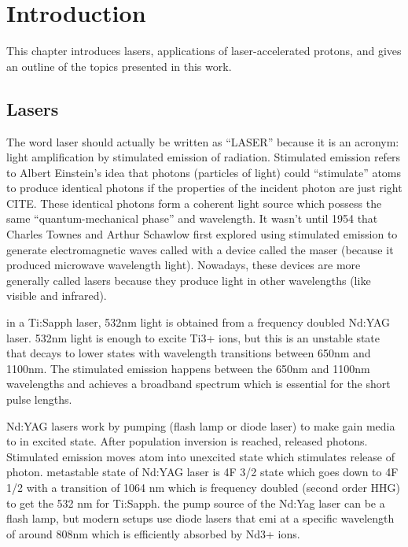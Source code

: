 \chapter{Introduction}
This chapter introduces lasers, applications of laser-accelerated protons, and gives an outline of the topics presented in this work.

\section{Lasers}

The word laser should actually be written as ``LASER'' because it is an acronym: light amplification by stimulated emission of radiation. Stimulated emission refers to Albert Einstein's idea that photons (particles of light) could ``stimulate'' atoms to produce identical photons if the properties of the incident photon are just right CITE. These identical photons form a coherent light source which possess the same ``quantum-mechanical phase'' and wavelength. It wasn't until 1954 that Charles Townes and Arthur Schawlow first explored using stimulated emission to generate electromagnetic waves called with a device called the maser (because it produced microwave wavelength light). Nowadays, these devices are more generally called lasers because they produce light in other wavelengths (like visible and infrared).

in a Ti:Sapph laser, 532nm light is obtained from a frequency doubled Nd:YAG laser. 532nm light is enough to excite Ti3+ ions, but this is an unstable state that decays to lower states with wavelength transitions between 650nm and 1100nm. The stimulated emission happens between the 650nm and 1100nm wavelengths and achieves a broadband spectrum which is essential for the short pulse lengths. 

Nd:YAG lasers work by pumping (flash lamp or diode laser) to make gain media to in excited state. After population inversion is reached, released photons. Stimulated emission moves atom into unexcited state which stimulates release of photon. metastable state of Nd:YAG laser is 4F 3/2 state which goes down to 4F 1/2 with a transition of 1064 nm which is frequency doubled (second order HHG) to get the 532 nm for Ti:Sapph. the pump source of the Nd:Yag laser can be a flash lamp, but modern setups use diode lasers that emi at a specific wavelength of around 808nm which is efficiently absorbed by Nd3+ ions. 

